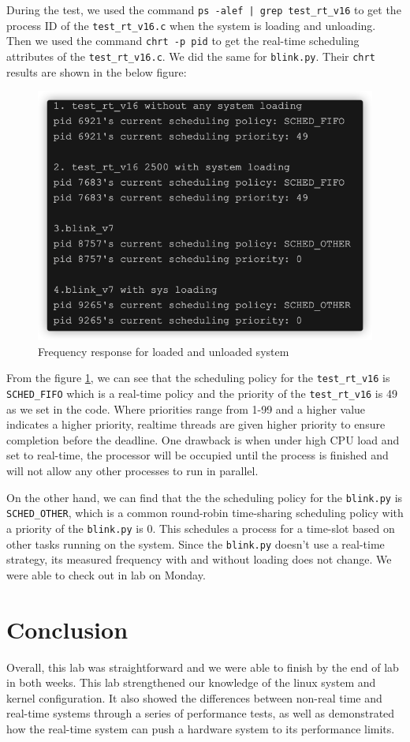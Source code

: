 \documentclass[a4paper,10pt]{article}
\newcommand{\code}[1]{\colorbox{light-gray}{\texttt{#1}}}
\begin{document}
During the test, we used the command \code{ps -alef | grep test\_rt\_v16} to get the process ID of the \code{test\_rt\_v16.c} when the system is loading and unloading. Then we used the command \code{chrt -p pid} to get the real-time scheduling attributes of the \code{test\_rt\_v16.c}. We did the same for \code{blink.py}. Their \code{chrt} results are shown in the below figure:

\begin{figure}[H]
\centering
\includegraphics[width=0.4\linewidth]{Images/chrt.png}
\caption{Frequency response for loaded and unloaded system}
\label{fig:figure14}
\end{figure}
From the figure \ref{fig:figure14}, we can see that the scheduling policy for the \code{test\_rt\_v16} is \code{SCHED\_FIFO} which is a real-time policy and the priority of the \code{test\_rt\_v16} is 49 as we set in the code. Where priorities range from 1-99 and a higher value indicates a higher priority, realtime threads are given higher priority to ensure completion before the deadline. One drawback is when under high CPU load and set to real-time, the processor will be occupied until the process is finished and will not allow any other processes to run in parallel. 

On the other hand, we can find that the the scheduling policy for the \code{blink.py} is \code{SCHED\_OTHER}, which is a common round-robin time-sharing scheduling policy with a priority of the \code{blink.py} is 0. This schedules a process for a time-slot based on other tasks running on the system. Since the \code{blink.py} doesn't use a real-time strategy, its measured frequency with and without loading does not change. We were able to check out in lab on Monday.
 
\section{Conclusion}

Overall, this lab was straightforward and we were able to finish by the end of lab in both weeks. This lab strengthened our knowledge of the linux system and kernel configuration. It also showed the differences between non-real time and real-time systems through a series of performance tests, as well as demonstrated how the real-time system can  push a hardware system to its performance limits.
\end{document}
